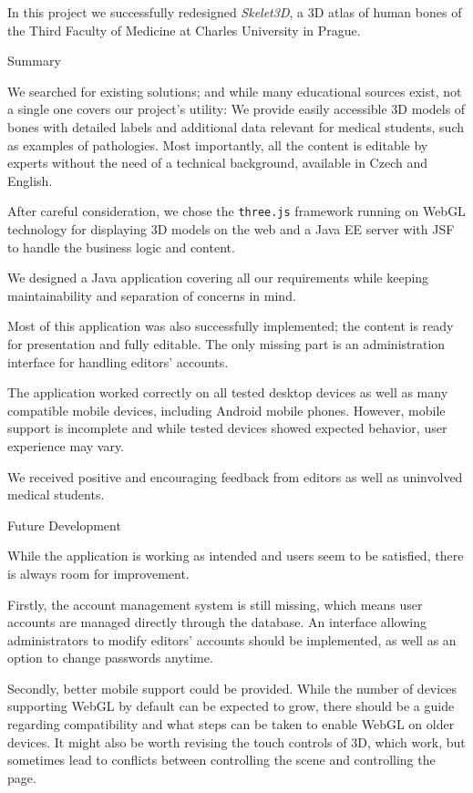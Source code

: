 In this project we successfully redesigned {\it Skelet3D}, a 3D atlas of human bones of the Third Faculty of Medicine at Charles University in Prague.

\sec Summary

We searched for existing solutions; and while many educational sources exist, not a single one covers our project’s utility: We provide easily accessible 3D models of bones with detailed labels and additional data relevant for medical students, such as examples of pathologies. Most importantly, all the content is editable by experts without the need of a technical background, available in Czech and English.

After careful consideration, we chose the {\tt three.js} framework running on WebGL technology for displaying 3D models on the web and a Java EE server with JSF to handle the business logic and content.

We designed a Java application covering all our requirements while keeping maintainability and separation of concerns in mind.

Most of this application was also successfully implemented; the content is ready for presentation and fully editable. The only missing part is an administration interface for handling editors’ accounts.

The application worked correctly on all tested desktop devices as well as many compatible mobile devices, including Android mobile phones. However, mobile support is incomplete and while tested devices showed expected behavior, user experience may vary.

We received positive and encouraging feedback from editors as well as uninvolved medical students.

\sec Future Development

While the application is working as intended and users seem to be satisfied, there is always room for improvement.

Firstly, the account management system is still missing, which means user accounts are managed directly through the database. An interface allowing administrators to modify editors’ accounts should be implemented, as well as an option to change passwords anytime.

Secondly, better mobile support could be provided. While the number of devices supporting WebGL by default can be expected to grow, there should be a guide regarding compatibility and what steps can be taken to enable WebGL on older devices. It might also be worth revising the touch controls of 3D, which work, but sometimes lead to conflicts between controlling the scene and controlling the page.

